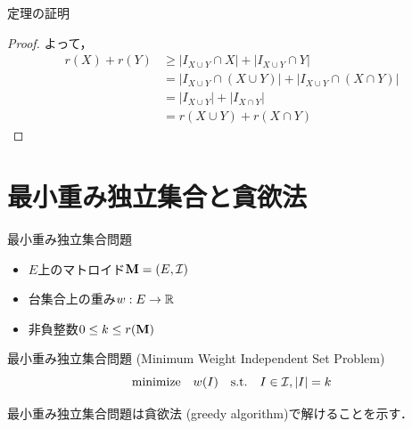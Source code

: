 \documentclass[14pt,aspectratio=169,xcolor=dvipsnames,table,onlytextwidth,dvipdfmx]{beamer}
\begin{document}
\begin{frame}{定理の証明}
\begin{proof}
    \bigskip
    よって，
    \begin{align*}
        r(X) + r(Y) 
        &\geq |I_{X \cup Y} \cap X| + |I_{X \cup Y} \cap Y| \\
        &= |I_{X \cup Y} \cap (X \cup Y) | + |I_{X \cup Y} \cap (X \cap Y)| \\
        &= |I_{X \cup Y}| + |I_{X \cap Y}| \\
        &= r(X \cup Y) + r(X \cap Y) 
    \end{align*}
    \end{proof}
\end{frame}

\section{最小重み独立集合と貪欲法}
\begin{frame}{最小重み独立集合問題}
    \begin{itemize}
        \item $E$上のマトロイド$\mathbf{M} = (E, \mathcal{I})$ %
        \item 台集合上の重み$w: E \to \mathbb{R}$
        \item 非負整数$0 \leq k \leq r(\mathbf{M})$
    \end{itemize}
    
    \vfill
    \begin{block}{最小重み独立集合問題 (Minimum Weight Independent Set Problem)}
        \[
           \text{minimize} \quad w(I) \quad\text{s.t.}\quad I \in \mathcal{I}, \lvert I\rvert = k
        \]
    \end{block}

    \vfill
     最小重み独立集合問題は\alert{貪欲法 (greedy algorithm)}で解けることを示す．
\end{frame}
\end{document}
